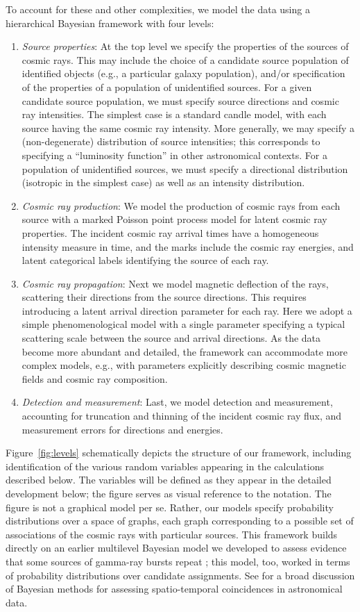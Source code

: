To account for these and other complexities, we model the data using a
hierarchical Bayesian framework with four levels:
\begin{enumerate}
\item {\em Source properties}:  At the top level we specify the properties
of the sources of cosmic rays.  This may include the choice of a candidate
source population of identified objects (e.g., a particular galaxy
population), and/or specification of the properties of a population of
unidentified sources.  For a given candidate source population, we must
specify source directions and cosmic ray intensities.  The simplest case is
a standard candle model, with each source having the same cosmic ray
intensity.  More generally, we may specify a (non-degenerate) distribution
of source intensities; this corresponds to specifying a ``luminosity
function'' in other astronomical contexts.  For a population of unidentified
sources, we must specify a directional distribution (isotropic in the
simplest case) as well as an intensity distribution.
\item {\em Cosmic ray production}:  We model the production of cosmic rays
from each source with a marked Poisson point process model for latent cosmic
ray properties.  The incident cosmic ray arrival times have a homogeneous
intensity measure in time, and the marks include the cosmic ray energies,
and latent categorical labels identifying the source of each ray.
\item {\em Cosmic ray propagation}:  Next we model magnetic deflection of
the rays, scattering their directions from the source directions.  
This requires introducing a latent arrival direction parameter for each ray.
Here we adopt a simple phenomenological model with a single parameter
specifying a typical scattering scale between the source and arrival
directions.  As the data become more abundant and detailed, the framework
can accommodate more complex models, e.g., with parameters explicitly
describing cosmic magnetic fields and cosmic ray composition.
\item {\em Detection and measurement}:  Last, we model detection and
measurement, accounting for truncation and thinning of the incident
cosmic ray flux, and measurement errors for directions and energies.
\end{enumerate}

Figure~\ref{fig:levels} schematically depicts the structure of our
framework, including identification of the various random variables
appearing in the calculations described below.  The variables will be
defined as they appear in the detailed development below; the figure serves
as visual reference to the notation.  The figure is not a graphical model
per se.  Rather, our models specify probability distributions over a space
of graphs, each graph corresponding to a possible set of associations of the
cosmic rays with particular sources.  This framework builds directly on an
earlier multilevel Bayesian model we developed to assess evidence that some
sources of gamma-ray bursts repeat \cite{LLW96}; this model, too, worked in
terms of probability distributions over candidate assignments.  See
\cite{Loredo12-Coinc} for a broad discussion of Bayesian methods for
assessing spatio-temporal coincidences in astronomical data.

